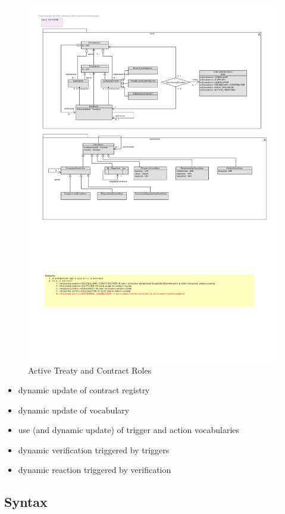 \documentclass{llncs}
\begin{document}
\begin{figure}[t]
\centering
\includegraphics[width=1.0\textwidth]{RoleModel2.pdf}
\caption{Active Treaty and Contract Roles}
\label{fig1}
\end{figure}

\begin{itemize}
  \item dynamic update of contract registry
  \item dynamic update of vocabulary
  \item use (and dynamic update) of trigger and action vocabularies
  \item dynamic verification triggered by triggers
  \item dynamic reaction triggered by verification
\end{itemize}


\subsection{Syntax}
\end{document}
